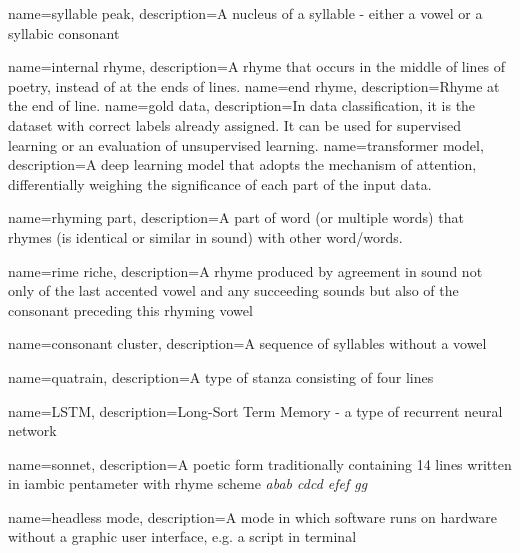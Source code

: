 
{
	name=syllable peak,
	description={A nucleus of a syllable - either a vowel or a syllabic consonant}
}

{
	name={internal rhyme},
	description={A rhyme that occurs in the middle of lines of poetry, instead of at the ends of lines.}
}
{
	name={end rhyme},
	description={Rhyme at the end of line.}
}
{
	name={gold data},
	description={In data classification, it is the dataset with correct labels already assigned. It can be used for supervised learning or an evaluation of unsupervised learning.}
}
{
	name=transformer model,
	description={A deep learning model that adopts the mechanism of attention, differentially weighing the significance of each part of the input data.}
}

{
	name=rhyming part,
	description={A part of word (or multiple words) that rhymes (is identical or similar in sound) with other word/words.}
}


{
	name=rime riche,
	description={A rhyme produced by agreement in sound not only of the last accented vowel and any succeeding sounds but also of the consonant preceding this rhyming vowel}
}


{
	name=consonant cluster,
	description={A sequence of syllables without a vowel}
}

{
	name=quatrain,
	description={A type of stanza consisting of four lines}
}

{
	name=LSTM,
	description={Long-Sort Term Memory - a type of recurrent neural network}
}

{
	name=sonnet,
	description={A poetic form traditionally containing 14 lines written in iambic pentameter with rhyme scheme \textit{abab cdcd efef gg}}
}

{
	name=headless mode,
	description={A mode in which software runs on hardware without a graphic user interface, e.g. a script in terminal}
}